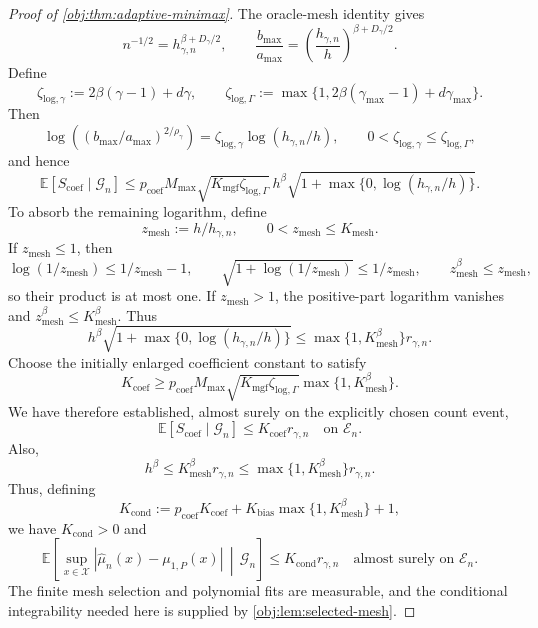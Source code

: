 \begin{proof}[Proof of \cref{obj:thm:adaptive-minimax}]
The oracle-mesh identity gives
\[
n^{-1/2}=h_{\gamma,n}^{\beta+D_\gamma/2},
\qquad
\frac{b_{\mathrm{max}}}{a_{\mathrm{max}}}
=\left(\frac{h_{\gamma,n}}h\right)^{\beta+D_\gamma/2}.
\]
Define
\[
\zeta_{\mathrm{log},\gamma}:=2\beta(\gamma-1)+d\gamma,
\qquad
\zeta_{\mathrm{log},\Gamma}
:=\max\{1,2\beta(\gamma_{\max}-1)+d\gamma_{\max}\}.
\]
Then
\[
\log\left((b_{\mathrm{max}}/a_{\mathrm{max}})^{2/\rho_\gamma}\right)
=\zeta_{\mathrm{log},\gamma}\log(h_{\gamma,n}/h),
\qquad
0<\zeta_{\mathrm{log},\gamma}\le\zeta_{\mathrm{log},\Gamma},
\]
and hence
\[
\mathbb E[S_{\mathrm{coef}}\mid\mathcal G_n]
\le p_{\mathrm{coef}}M_{\mathrm{max}}
\sqrt{K_{\mathrm{mgf}}\zeta_{\mathrm{log},\Gamma}}\,
 h^\beta\sqrt{1+\max\{0,\log(h_{\gamma,n}/h)\}}.
\]
To absorb the remaining logarithm, define
\[
z_{\mathrm{mesh}}:=h/h_{\gamma,n},
\qquad
0<z_{\mathrm{mesh}}\le K_{\mathrm{mesh}}.
\]
If \(z_{\mathrm{mesh}}\le1\), then
\[
\log(1/z_{\mathrm{mesh}})\le1/z_{\mathrm{mesh}}-1,
\qquad
\sqrt{1+\log(1/z_{\mathrm{mesh}})}\le1/z_{\mathrm{mesh}},
\qquad
z_{\mathrm{mesh}}^\beta\le z_{\mathrm{mesh}},
\]
so their product is at most one. If \(z_{\mathrm{mesh}}>1\), the positive-part logarithm vanishes and \(z_{\mathrm{mesh}}^\beta\le K_{\mathrm{mesh}}^\beta\). Thus
\[
h^\beta\sqrt{1+\max\{0,\log(h_{\gamma,n}/h)\}}
\le\max\{1,K_{\mathrm{mesh}}^\beta\}r_{\gamma,n}.
\]
Choose the initially enlarged coefficient constant to satisfy
\[
K_{\mathrm{coef}}\ge
p_{\mathrm{coef}}M_{\mathrm{max}}
\sqrt{K_{\mathrm{mgf}}\zeta_{\mathrm{log},\Gamma}}
\max\{1,K_{\mathrm{mesh}}^\beta\}.
\]
We have therefore established, almost surely on the explicitly chosen count event,
\[
\mathbb E[S_{\mathrm{coef}}\mid\mathcal G_n]
\le K_{\mathrm{coef}}r_{\gamma,n}
\quad\text{on }\mathcal E_n.
\]
Also,
\[
h^\beta
\le K_{\mathrm{mesh}}^\beta r_{\gamma,n}
\le \max\{1,K_{\mathrm{mesh}}^\beta\}r_{\gamma,n}.
\]
Thus, defining
\[
K_{\mathrm{cond}}
:=
p_{\mathrm{coef}}K_{\mathrm{coef}}
+
K_{\mathrm{bias}}\max\{1,K_{\mathrm{mesh}}^\beta\}
+1,
\]
we have \(K_{\mathrm{cond}}>0\) and
\[
\mathbb E\!\left[
\sup_{x\in\mathcal X}
|\widehat\mu_n(x)-\mu_{1,P}(x)|
\,\middle|\,\mathcal G_n
\right]
\le K_{\mathrm{cond}}r_{\gamma,n}
\quad\text{almost surely on }\mathcal E_n.
\]
The finite mesh selection and polynomial fits are measurable, and the conditional integrability needed here is supplied by \cref{obj:lem:selected-mesh}.


\end{proof}
